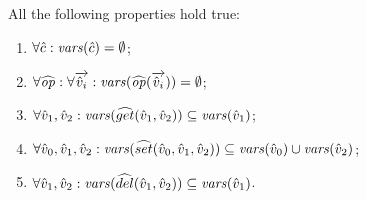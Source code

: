 \begin{assumption}[Variables]
\label{asm:variables}
All the following properties hold true:
\begin{enumerate}
\item $\forall \hat{c}: \mathit{vars}(\hat{c}) = \emptyset$;
\item $\forall \widehat{\mathit{op}}: \forall \overrightarrow{\hat{v}_i}: \mathit{vars}(\widehat{\mathit{op}}(\overrightarrow{\hat{v}_i})) = \emptyset$;
\item $\forall \hat{v}_1,\hat{v}_2: \mathit{vars}(\widehat{get}(\hat{v}_1,\hat{v}_2)) \subseteq \mathit{vars}(\hat{v}_1)$;
\item $\forall \hat{v}_0,\hat{v}_1,\hat{v}_2: \mathit{vars}(\widehat{set}(\hat{v}_0,\hat{v}_1,\hat{v}_2)) \subseteq \mathit{vars}(\hat{v}_0) \cup \mathit{vars}(\hat{v}_2)$;
\item $\forall \hat{v}_1,\hat{v}_2: \mathit{vars}(\widehat{del}(\hat{v}_1,\hat{v}_2)) \subseteq \mathit{vars}(\hat{v}_1)$.
\end{enumerate}
\end{assumption}